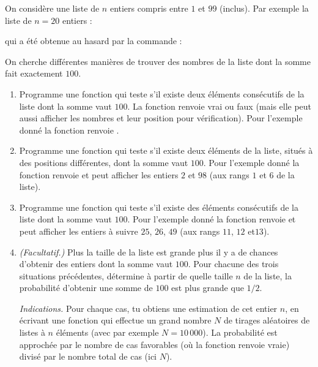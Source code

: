 \documentclass[11pt,class=report,crop=false]{standalone}
\begin{document}
\begin{activite}


On considère une liste de $n$ entiers compris entre $1$ et $99$ (inclus).
Par exemple la liste de $n=20$ entiers :\\
\centerline{\ci{[16,2,85,27,9,45,98,73,12,26,46,25,26,49,18,99,10,86,7,42]}}
qui a été obtenue au hasard par la commande :\\
\centerline{}

On cherche différentes manières de trouver des nombres de la liste dont la somme fait exactement $100$.

\begin{enumerate}
  \item Programme une fonction  qui teste s'il existe deux éléments consécutifs de la liste dont la somme vaut $100$. La fonction renvoie \og{}vrai\fg{} ou \og{}faux\fg{} (mais elle peut aussi afficher les nombres et leur position pour vérification). Pour l'exemple donné la fonction renvoie .
  
  \item Programme une fonction  qui teste s'il existe deux éléments de la liste, situés à des positions différentes, dont la somme vaut $100$. 
 Pour l'exemple donné la fonction renvoie  et peut afficher les entiers $2$ et $98$ (aux rangs $1$ et $6$ de la liste). 
 
 
  \item Programme une fonction  qui teste s'il existe des éléments consécutifs de la liste dont la somme vaut $100$. 
 Pour l'exemple donné la fonction renvoie  et peut afficher les entiers à suivre $25$, $26$, $49$ (aux rangs $11$, $12$ et$13$).
 
 \item \emph{(Facultatif.)} Plus la taille de la liste est grande plus il y a de chances d'obtenir des entiers dont la somme vaut $100$. Pour chacune des trois situations précédentes, détermine à partir de quelle taille $n$ de la liste, la probabilité d'obtenir une somme de $100$ est plus grande que $1/2$. 
 
  \emph{Indications.} Pour chaque cas, tu obtiens une estimation de cet entier $n$, en écrivant une fonction  qui effectue un grand nombre $N$ de tirages aléatoires de listes à $n$ éléments (avec par exemple $N=10\,000$). La probabilité est approchée par le nombre de cas favorables (où la fonction renvoie vraie) divisé par le nombre total de cas (ici $N$).
 
 
  
\end{enumerate}

\end{activite}
\end{document}
